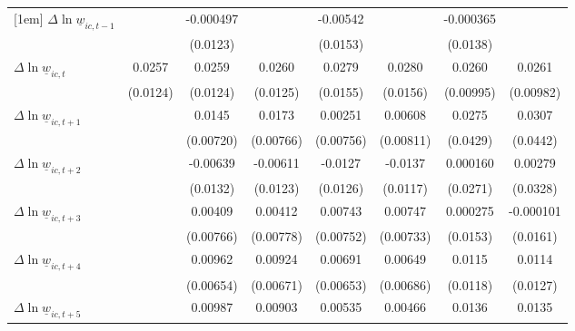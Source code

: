 {\begin{tabular}{l*{7}{c}}
[1em]
$\Delta \ln \underline{w}_{ic,t-1}$&                  &-0.000497         &                  & -0.00542         &                  &-0.000365         &                  \\
          &                  & (0.0123)         &                  & (0.0153)         &                  & (0.0138)         &                  \\
[1em]
$\Delta \ln \underline{w}_{ic,t}$&   0.0257\sym{**} &   0.0259\sym{**} &   0.0260\sym{**} &   0.0279\sym{*}  &   0.0280\sym{*}  &   0.0260\sym{**} &   0.0261\sym{**} \\
          & (0.0124)         & (0.0124)         & (0.0125)         & (0.0155)         & (0.0156)         &(0.00995)         &(0.00982)         \\
[1em]
$\Delta \ln \underline{w}_{ic,t+1}$&                  &   0.0145\sym{*}  &   0.0173\sym{**} &  0.00251         &  0.00608         &   0.0275         &   0.0307         \\
          &                  &(0.00720)         &(0.00766)         &(0.00756)         &(0.00811)         & (0.0429)         & (0.0442)         \\
[1em]
$\Delta \ln \underline{w}_{ic,t+2}$&                  & -0.00639         & -0.00611         &  -0.0127         &  -0.0137         & 0.000160         &  0.00279         \\
          &                  & (0.0132)         & (0.0123)         & (0.0126)         & (0.0117)         & (0.0271)         & (0.0328)         \\
[1em]
$\Delta \ln \underline{w}_{ic,t+3}$&                  &  0.00409         &  0.00412         &  0.00743         &  0.00747         & 0.000275         &-0.000101         \\
          &                  &(0.00766)         &(0.00778)         &(0.00752)         &(0.00733)         & (0.0153)         & (0.0161)         \\
[1em]
$\Delta \ln \underline{w}_{ic,t+4}$&                  &  0.00962         &  0.00924         &  0.00691         &  0.00649         &   0.0115         &   0.0114         \\
          &                  &(0.00654)         &(0.00671)         &(0.00653)         &(0.00686)         & (0.0118)         & (0.0127)         \\
[1em]
$\Delta \ln \underline{w}_{ic,t+5}$&                  &  0.00987         &  0.00903         &  0.00535         &  0.00466         &   0.0136         &   0.0135         \\

\end{tabular}}
